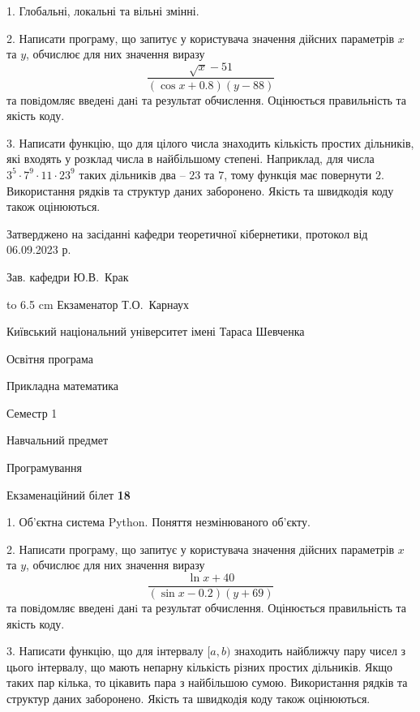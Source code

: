 \documentclass[12pt, ukrainian]{article}
\begin{document}
{%
1. Глобальні, локальні та вільні змінні.%
\par
2. Написати програму, що запитує у користувача значення дійсних параметрів $x$ та $y$, обчислює для них значення виразу 
$$\frac{\sqrt x - 51}{(\cos x + 0.8) (y - 88)}$$ 
та повiдомляє введенi данi та результат обчислення.
 Оцінюється правильність та якість коду.

\par
3. Написати функцію, що для цілого числа знаходить кількість простих дільників, які входять у розклад числа в найбільшому степені. Наприклад, для числа $3^5{\cdot}7^9{\cdot}11{\cdot}23^{9}$ таких дільників два – $23$ та $7$, тому функція має повернути $2$.  Використання рядків та структур даних заборонено. Якість та швидкодія коду також оцінюються. 

}
{\smallskip\smallskip \begin {scriptsize} Затверджено на засіданні кафедри теоретичної кібернетики, протокол   від   06.09.2023 р.\par\smallskip\smallskip\smallskip\smallskip
{\parbox {6.5 cm} {Зав. кафедри \dotfill Ю.В.~Крак}}\hspace {0.7cm} {\hbox to 6.5 cm { Екзаменатор \dotfill Т.О.~Карнаух}} \end{scriptsize}}
\vspace{0.9cm}
{{\begin {scriptsize}\par
{ \center  Київський національний університет імені Тараса Шевченка \par}
{\parbox {5 cm}{Освітня програма \hfill}{\parbox {7 cm}{Прикладна математика\hfill}}\parbox {6 cm}{\hfill Семестр 1}}\par
{\parbox {5 cm} {Навчальний предмет \hfill}\parbox {7 cm}{Програмування \hfill}\parbox {6cm}{\hfill}\par}\vspace{-15pt} \end{scriptsize}}{\center Екзаменаційний білет \No \textbf { 18 }\par}}
{%
1. Об’єктна система Python. Поняття незмінюваного об'єкту.%
\par
2. Написати програму, що запитує у користувача значення дійсних параметрів $x$ та $y$, обчислює для них значення виразу 
$$\frac{\ln x + 40}{(\sin x - 0.2) (y + 69)}$$ 
та повiдомляє введенi данi та результат обчислення.
 Оцінюється правильність та якість коду.

\par
3. Написати функцію, що для інтервалу $[a, b)$ знаходить найближчу пару чисел з цього інтервалу, що мають непарну кількість різних простих дільників. Якщо таких пар кілька, то цікавить пара з найбільшою сумою.  Використання рядків та структур даних заборонено. Якість та швидкодія коду також оцінюються. 

}
\end{document}
